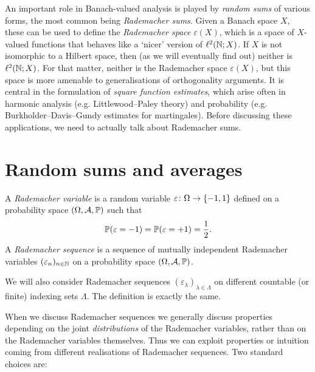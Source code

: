 An important role in Banach-valued analysis is played by \emph{random sums} of various forms, the most common being \emph{Rademacher sums}.
Given a Banach space $X$, these can be used to define the \emph{Rademacher space} $\varepsilon(X)$, which is a space of $X$-valued functions that behaves like a `nicer' version of $\ell^{2}(\N;X)$.
If $X$ is not isomorphic to a Hilbert space, then (as we will eventually find out) neither is $\ell^{2}(\N;X)$.
For that matter, neither is the Rademacher space $\varepsilon(X)$, but this space is more amenable to generalisations of orthogonality arguments.
It is central in the formulation of \emph{square function estimates}, which arise often in harmonic analysis (e.g. Littlewood--Paley theory) and probability (e.g. Burkholder--Davis--Gundy estimates for martingales).
Before discussing these applications, we need to actually talk about Rademacher sums.

\section{Random sums and averages}

\begin{defn}
  A \emph{Rademacher variable} is a random variable $\map{\varepsilon}{\Omega}{\{-1, 1\}}$ defined on a probability space $(\Omega,\mc{A},\P)$ such that
  \begin{equation*}
    \P(\varepsilon = -1) = \P(\varepsilon = +1) = \frac{1}{2}.
  \end{equation*}
  A \emph{Rademacher sequence} is a sequence of mutually independent Rademacher variables $(\varepsilon_{n})_{n \in \N}$ on a probability space $(\Omega,\mc{A},\P)$.
\end{defn}

\begin{rmk}
  We will also consider Rademacher sequences $(\varepsilon_{\lambda})_{\lambda \in \Lambda}$ on different countable (or finite) indexing sets $\Lambda$.
  The definition is exactly the same.
\end{rmk}

When we discuss Rademacher sequences we generally discuss properties depending on the joint \emph{distributions} of the Rademacher variables, rather than on the Rademacher variables themselves.
Thus we can exploit properties or intuition coming from different realisations of Rademacher sequences.
Two standard choices are:

